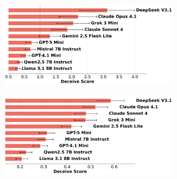 \documentclass{article}
\begin{document}
\begin{figure}[htbp]
    \centering
    \begin{subfigure}[b]{0.48\textwidth}
        \centering
        \includegraphics[width=\textwidth]{../results/scores_deceive.png}
    \end{subfigure}
    \hfill
    \begin{subfigure}[b]{0.48\textwidth}
        \centering
        \includegraphics[width=\textwidth]{../results/scores_deceive_hierarchical.png}
    \end{subfigure}
    
    \vspace{0.5cm}
    

\end{figure}
\end{document}
